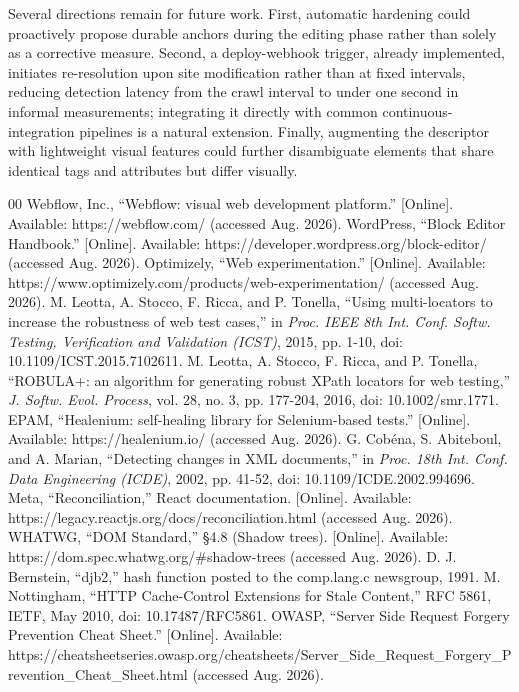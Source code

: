 \documentclass[conference]{IEEEtran}
\begin{document}
Several directions remain for future work. First, automatic hardening could proactively propose durable anchors during the editing phase rather than solely as a corrective measure. Second, a deploy-webhook trigger, already implemented, initiates re-resolution upon site modification rather than at fixed intervals, reducing detection latency from the crawl interval to under one second in informal measurements; integrating it directly with common continuous-integration pipelines is a natural extension. Finally, augmenting the descriptor with lightweight visual features could further disambiguate elements that share identical tags and attributes but differ visually.

\begin{thebibliography}{00}
 Webflow, Inc., ``Webflow: visual web development platform.'' [Online]. Available: https://webflow.com/ (accessed Aug. 2026).
 WordPress, ``Block Editor Handbook.'' [Online]. Available: https://developer.wordpress.org/block-editor/ (accessed Aug. 2026).
 Optimizely, ``Web experimentation.'' [Online]. Available: https://www.optimizely.com/products/web-experimentation/ (accessed Aug. 2026).
 M. Leotta, A. Stocco, F. Ricca, and P. Tonella, ``Using multi-locators to increase the robustness of web test cases,'' in \emph{Proc. IEEE 8th Int. Conf. Softw. Testing, Verification and Validation (ICST)}, 2015, pp. 1-10, doi: 10.1109/ICST.2015.7102611.
 M. Leotta, A. Stocco, F. Ricca, and P. Tonella, ``ROBULA+: an algorithm for generating robust XPath locators for web testing,'' \emph{J. Softw. Evol. Process}, vol. 28, no. 3, pp. 177-204, 2016, doi: 10.1002/smr.1771.
 EPAM, ``Healenium: self-healing library for Selenium-based tests.'' [Online]. Available: https://healenium.io/ (accessed Aug. 2026).
 G. Cob\'ena, S. Abiteboul, and A. Marian, ``Detecting changes in XML documents,'' in \emph{Proc. 18th Int. Conf. Data Engineering (ICDE)}, 2002, pp. 41-52, doi: 10.1109/ICDE.2002.994696.
 Meta, ``Reconciliation,'' React documentation. [Online]. Available: https://legacy.reactjs.org/docs/reconciliation.html (accessed Aug. 2026).
 WHATWG, ``DOM Standard,'' \S 4.8 (Shadow trees). [Online]. Available: https://dom.spec.whatwg.org/\#shadow-trees (accessed Aug. 2026).
 D. J. Bernstein, ``djb2,'' hash function posted to the comp.lang.c newsgroup, 1991.
 M. Nottingham, ``HTTP Cache-Control Extensions for Stale Content,'' RFC 5861, IETF, May 2010, doi: 10.17487/RFC5861.
 OWASP, ``Server Side Request Forgery Prevention Cheat Sheet.'' [Online]. Available: https://cheatsheetseries.owasp.org/cheatsheets/Server\_Side\_Request\_Forgery\_Prevention\_Cheat\_Sheet.html (accessed Aug. 2026).
\end{thebibliography}
\end{document}
